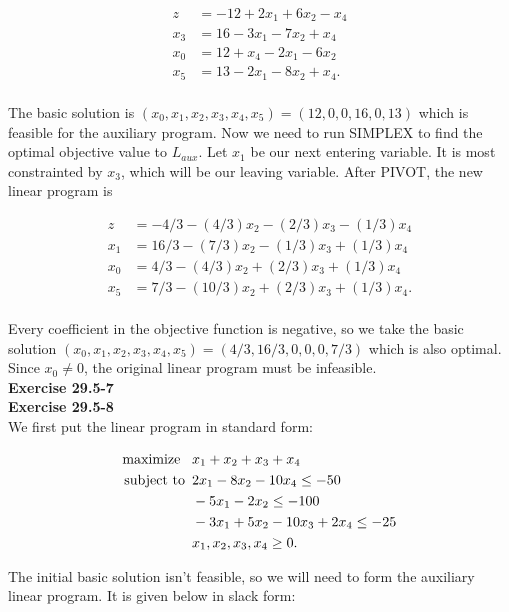 \documentclass{article}
\begin{document}
\begin{align*}
z &= -12 + 2x_1 + 6x_2 - x_4\\
x_3 &= 16 - 3x_1 - 7x_2 + x_4  \\
x_0 &= 12 + x_4 - 2x_1 - 6x_2 \\
x_5 &= 13 - 2x_1 - 8x_2 + x_4. \\
\end{align*}

The basic solution is $(x_0,x_1,x_2,x_3,x_4,x_5) = (12, 0,0,16,0,13)$ which is feasible for the auxiliary program.  Now we need to run SIMPLEX to find the optimal objective value to $L_{aux}$.  Let $x_1$ be our next entering variable.  It is most constrainted by $x_3$, which will be our leaving variable.  After PIVOT, the new linear program is

\begin{align*}
z &= -4/3 - (4/3)x_2 - (2/3)x_3 - (1/3)x_4 \\
x_1 &= 16/3 - (7/3)x_2 - (1/3)x_3 + (1/3)x_4  \\
x_0 &= 4/3 - (4/3)x_2 + (2/3)x_3 + (1/3)x_4 \\
x_5 &= 7/3 - (10/3)x_2 + (2/3)x_3 + (1/3)x_4. \\
\end{align*}

Every coefficient in the objective function is negative, so we take the basic solution $(x_0,x_1,x_2,x_3,x_4,x_5) = (4/3, 16/3, 0,0,0,7/3)$ which is also optimal.  Since $x_0 \neq 0$, the original linear program must be infeasible. \\

\noindent\textbf{Exercise 29.5-7}\\

\noindent\textbf{Exercise 29.5-8}\\

We first put the linear program in standard form:

\begin{align*}
\mbox{maximize \,\,\,} & x_1 + x_2 + x_3 + x_4 \\
\mbox{subject to \,} & 2x_1 - 8x_2 - 10x_4 \leq -50 \\
& -5x_1 - 2x_2 \leq -100 \\
& -3x_1 + 5x_2 - 10x_3 + 2x_4 \leq -25\\
& x_1,x_2,x_3,x_4 \geq 0.
\end{align*}

The initial basic solution isn't feasible, so we will need to form the auxiliary linear program.  It is given below in slack form:
\end{document}
